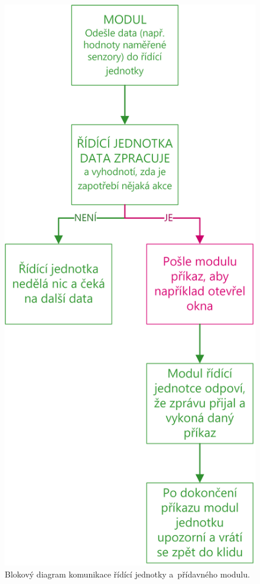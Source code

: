 \begin{figure}[h]
    \centering
    \includegraphics[scale=0.9]{img/SOFTWARE/KOMUNIKACE_MODULU.png}
    \caption{Blokový diagram komunikace řídící jednotky a~přídavného modulu.}
    \label{fig:PPCU-to-MODULE-communication}
\end{figure}

